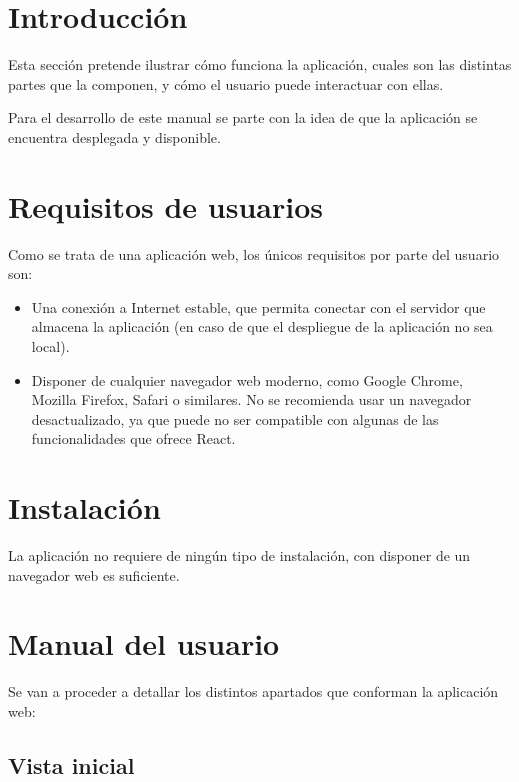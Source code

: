 
\section{Introducción}

Esta sección pretende ilustrar cómo funciona la aplicación, cuales son las distintas partes que la componen, y cómo el usuario puede interactuar con ellas. 

Para el desarrollo de este manual se parte con la idea de que la aplicación se encuentra desplegada y disponible.

\section{Requisitos de usuarios}

Como se trata de una aplicación web, los únicos requisitos por parte del usuario son:

\begin{itemize}
  \item Una conexión a Internet estable, que permita conectar con el servidor que almacena la aplicación (en caso de que el despliegue de la aplicación no sea local).
  \item Disponer de cualquier navegador web moderno, como Google Chrome, Mozilla Firefox, Safari o similares. No se recomienda usar un navegador desactualizado, ya que puede no ser compatible con algunas de las funcionalidades que ofrece React.
\end{itemize}


\section{Instalación}

La aplicación no requiere de ningún tipo de instalación, con disponer de un navegador web es suficiente.

\section{Manual del usuario}

Se van a proceder a detallar los distintos apartados que conforman la aplicación web:

\subsection{Vista inicial}

